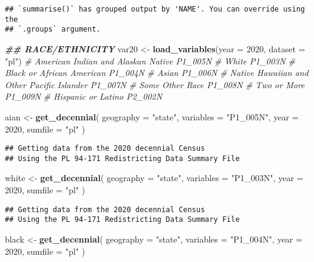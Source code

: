 \documentclass[
]{article}
\newenvironment{Shaded}{\begin{snugshade}}{\end{snugshade}}
\newcommand{\AttributeTok}[1]{\textcolor[rgb]{0.13,0.29,0.53}{#1}}
\newcommand{\CommentTok}[1]{\textcolor[rgb]{0.56,0.35,0.01}{\textit{#1}}}
\newcommand{\DecValTok}[1]{\textcolor[rgb]{0.00,0.00,0.81}{#1}}
\newcommand{\DocumentationTok}[1]{\textcolor[rgb]{0.56,0.35,0.01}{\textbf{\textit{#1}}}}
\newcommand{\FunctionTok}[1]{\textcolor[rgb]{0.13,0.29,0.53}{\textbf{#1}}}
\newcommand{\NormalTok}[1]{#1}
\newcommand{\OtherTok}[1]{\textcolor[rgb]{0.56,0.35,0.01}{#1}}
\newcommand{\StringTok}[1]{\textcolor[rgb]{0.31,0.60,0.02}{#1}}
\begin{document}
\begin{verbatim}
## `summarise()` has grouped output by 'NAME'. You can override using the
## `.groups` argument.
\end{verbatim}

\begin{Shaded}
\begin{Highlighting}[]
\DocumentationTok{\#\# RACE/ETHNICITY}
\NormalTok{var20 }\OtherTok{\textless{}{-}} \FunctionTok{load\_variables}\NormalTok{(}\AttributeTok{year =} \DecValTok{2020}\NormalTok{, }\AttributeTok{dataset =} \StringTok{"pl"}\NormalTok{)}
\CommentTok{\# American Indian and Alaskan Native P1\_005N}
\CommentTok{\# White P1\_003N}
\CommentTok{\# Black or African American P1\_004N}
\CommentTok{\# Asian P1\_006N}
\CommentTok{\# Native Hawaiian and Other Pacific Islander P1\_007N}
\CommentTok{\# Some Other Race P1\_008N}
\CommentTok{\# Two or More P1\_009N}
\CommentTok{\# Hispanic or Latino P2\_002N}

\NormalTok{aian }\OtherTok{\textless{}{-}} \FunctionTok{get\_decennial}\NormalTok{(}
  \AttributeTok{geography =} \StringTok{"state"}\NormalTok{,}
  \AttributeTok{variables =} \StringTok{"P1\_005N"}\NormalTok{,}
  \AttributeTok{year =} \DecValTok{2020}\NormalTok{,}
  \AttributeTok{sumfile =} \StringTok{"pl"}
\NormalTok{)}
\end{Highlighting}
\end{Shaded}

\begin{verbatim}
## Getting data from the 2020 decennial Census
## Using the PL 94-171 Redistricting Data Summary File
\end{verbatim}

\begin{Shaded}
\begin{Highlighting}[]
\NormalTok{white }\OtherTok{\textless{}{-}} \FunctionTok{get\_decennial}\NormalTok{(}
  \AttributeTok{geography =} \StringTok{"state"}\NormalTok{,}
  \AttributeTok{variables =} \StringTok{"P1\_003N"}\NormalTok{,}
  \AttributeTok{year =} \DecValTok{2020}\NormalTok{,}
  \AttributeTok{sumfile =} \StringTok{"pl"}
\NormalTok{)}
\end{Highlighting}
\end{Shaded}

\begin{verbatim}
## Getting data from the 2020 decennial Census
## Using the PL 94-171 Redistricting Data Summary File
\end{verbatim}

\begin{Shaded}
\begin{Highlighting}[]
\NormalTok{black }\OtherTok{\textless{}{-}} \FunctionTok{get\_decennial}\NormalTok{(}
  \AttributeTok{geography =} \StringTok{"state"}\NormalTok{,}
  \AttributeTok{variables =} \StringTok{"P1\_004N"}\NormalTok{,}
  \AttributeTok{year =} \DecValTok{2020}\NormalTok{,}
  \AttributeTok{sumfile =} \StringTok{"pl"}
\NormalTok{)}
\end{Highlighting}
\end{Shaded}
\end{document}
